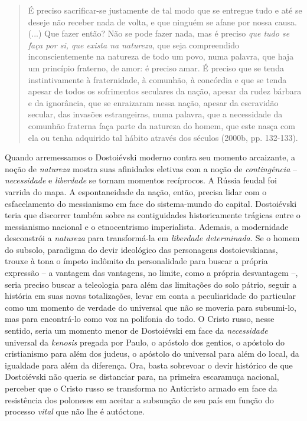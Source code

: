\begin{quote}
É preciso sacrificar-se justamente de tal modo que se entregue tudo e
até se deseje não receber nada de volta, e que ninguém se afane por
nossa causa. (...) Que fazer então? Não se pode fazer nada, mas é
preciso \emph{que tudo se faça por si, que exista na natureza}, que seja
compreendido inconscientemente na natureza de todo um povo, numa
palavra, que haja um princípio fraterno, de amor: é preciso amar. É
preciso que se tenda instintivamente à fraternidade, à comunhão, à
concórdia e que se tenda apesar de todos os sofrimentos seculares da
nação, apesar da rudez bárbara e da ignorância, que se enraizaram nessa
nação, apesar da escravidão secular, das invasões estrangeiras, numa
palavra, que a necessidade da comunhão fraterna faça parte da natureza
do homem, que este nasça com ela ou tenha adquirido tal hábito através
dos séculos (2000b, pp. 132-133).
\end{quote}

Quando arremessamos o Dostoiévski moderno contra seu momento arcaizante,
a noção de \emph{natureza} mostra suas afinidades eletivas com a noção
de \emph{contingência} -- \emph{necessidade} e \emph{liberdade} se
tornam momentos recíprocos. A Rússia feudal foi varrida do mapa. A
espontaneidade da nação, então, precisa lidar com o esfacelamento do
messianismo em face do sistema-mundo do capital. Dostoiévski teria que
discorrer também sobre as contiguidades historicamente trágicas entre o
messianismo nacional e o etnocentrismo imperialista. Ademais, a
modernidade desconstrói a \emph{natureza} para transformá-la em
\emph{liberdade determinada.} Se o homem do subsolo, paradigma do devir
ideológico das personagens dostoievskianas, trouxe à tona o ímpeto
indômito da personalidade para buscar a própria expressão -- a vantagem
das vantagens, no limite, como a própria desvantagem --, seria preciso
buscar a teleologia para além das limitações do solo pátrio, seguir a
história em suas novas totalizações, levar em conta a peculiaridade do
particular como um momento de verdade do universal que não se moveria
para subsumi-lo, mas para encontrá-lo como voz na polifonia do todo. O
Cristo russo, nesse sentido, seria um momento menor de Dostoiévski em
face da \emph{necessidade} universal da \emph{kenosis} pregada por
Paulo, o apóstolo dos gentios, o apóstolo do cristianismo para além dos
judeus, o apóstolo do universal para além do local, da igualdade para
além da diferença. Ora, basta sobrevoar o devir histórico de que
Dostoiévski não queria se distanciar para, na primeira escaramuça
nacional, perceber que o Cristo russo se transforma no Anticristo armado
em face da resistência dos poloneses em aceitar a subsunção de seu país
em função do processo \emph{vital} que não lhe é autóctone.

